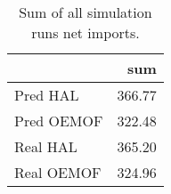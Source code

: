 \begin{table}[h!]
\centering
\caption{Sum of all simulation runs net imports.}
\label{t/res/schedule}
\begin{tabular}{lr}
\toprule
{} &    sum \\
\midrule
Pred HAL   & 366.77 \\
Pred OEMOF & 322.48 \\
Real HAL   & 365.20 \\
Real OEMOF & 324.96 \\
\bottomrule
\end{tabular}
\end{table}
